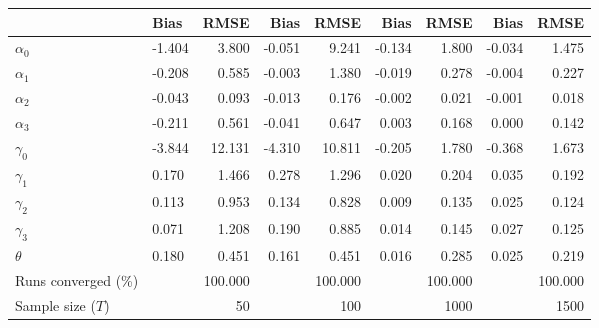 
\begin{tabular}[t]{llrrrrrrr}
\toprule
  & Bias & RMSE & Bias & RMSE & Bias & RMSE & Bias & RMSE\\
\midrule
$\alpha_{0}$ & -1.404 & 3.800 & -0.051 & 9.241 & -0.134 & 1.800 & -0.034 & 1.475\\
$\alpha_{1}$ & -0.208 & 0.585 & -0.003 & 1.380 & -0.019 & 0.278 & -0.004 & 0.227\\
$\alpha_{2}$ & -0.043 & 0.093 & -0.013 & 0.176 & -0.002 & 0.021 & -0.001 & 0.018\\
$\alpha_{3}$ & -0.211 & 0.561 & -0.041 & 0.647 & 0.003 & 0.168 & 0.000 & 0.142\\
$\gamma_{0}$ & -3.844 & 12.131 & -4.310 & 10.811 & -0.205 & 1.780 & -0.368 & 1.673\\
$\gamma_{1}$ & 0.170 & 1.466 & 0.278 & 1.296 & 0.020 & 0.204 & 0.035 & 0.192\\
$\gamma_{2}$ & 0.113 & 0.953 & 0.134 & 0.828 & 0.009 & 0.135 & 0.025 & 0.124\\
$\gamma_{3}$ & 0.071 & 1.208 & 0.190 & 0.885 & 0.014 & 0.145 & 0.027 & 0.125\\
$\theta$ & 0.180 & 0.451 & 0.161 & 0.451 & 0.016 & 0.285 & 0.025 & 0.219\\
Runs converged (\%) &  & 100.000 &  & 100.000 &  & 100.000 &  & 100.000\\
Sample size ($T$) &  & 50 &  & 100 &  & 1000 &  & 1500\\
\bottomrule
\end{tabular}
